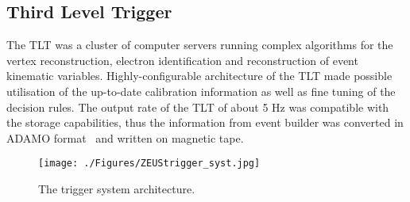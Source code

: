 \subsection{Third Level Trigger}
\label{subsec:tlt}
The TLT was a cluster of computer servers running complex algorithms for the vertex reconstruction, electron identification and reconstruction of event kinematic variables. Highly-configurable architecture of the TLT made possible utilisation of the up-to-date calibration information as well as fine tuning of the decision rules. The output rate of the TLT of about 5 Hz was compatible with the storage capabilities, thus the information from event builder was converted in ADAMO format~\cite{adamo} and written on magnetic tape.

\begin{figure}[h]
	\centering
		\texttt{[image: ./Figures/ZEUStrigger\_syst.jpg]}
	\caption{The \zeus trigger system architecture.}
	\label{fig:ZEUStrigger_syst}
\end{figure}
\newpage
